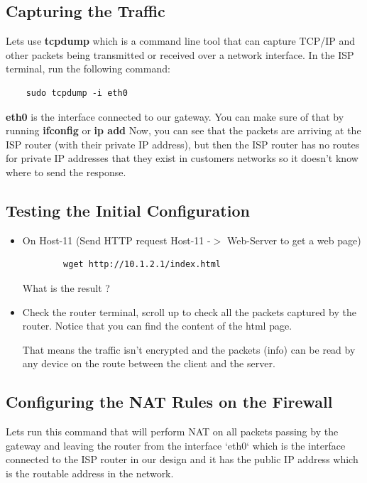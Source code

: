 \subsection{Capturing the Traffic}
Lets use \textbf{tcpdump} which is a command line tool that can capture TCP/IP and other packets being transmitted or received over a network interface.
\newline
\newline
In the ISP terminal, run the following command:
\begin{verbatim}
    sudo tcpdump -i eth0
\end{verbatim}

\textbf{eth0} is the interface connected to our gateway. You can make sure of that by running \textbf{ifconfig} or \textbf{ip add}
\newline
\newline
Now, you can see that the packets are arriving at the ISP router (with their private IP address), but then the ISP router has no routes for private IP addresses that they exist in customers networks so it doesn't know where to send the response.

\subsection{Testing the Initial Configuration}\label{Testing the Initial Configuration}
\begin{itemize}
	\item On Host-11 (Send HTTP request Host-11 -$>$ Web-Server to get a web page)
	\begin{verbatim}
	    wget http://10.1.2.1/index.html
	\end{verbatim}

	What is the result ?

	\item Check the router terminal, scroll up to check all the packets captured by the router. Notice that you can find the content of the html page.

		That means the traffic isn't encrypted and the packets (info) can be read by any device on the route between the client and the server.
\end{itemize}
\subsection{Configuring the NAT Rules on the Firewall}
Lets run this command that will perform NAT on all packets passing by the gateway and leaving the router from the interface `eth0` which is the interface connected to the ISP router in our design and it has the public IP address which is the routable address in the network.

